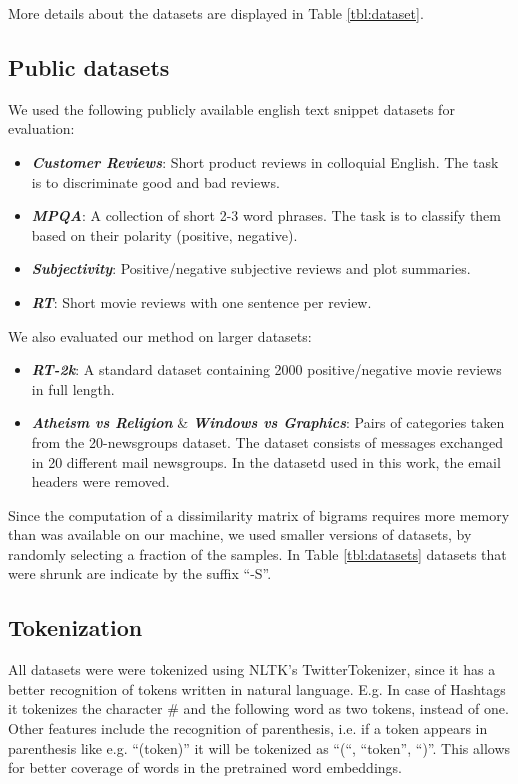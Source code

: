 More details about the datasets are displayed in Table \ref{tbl:dataset}. 

\subsection{Public datasets}

We used the following publicly available english text snippet datasets for
evaluation:

\begin{itemize}
  \item \textbf{\textit{Customer Reviews}}: Short product reviews in colloquial
  English. The task is to discriminate good and bad reviews.
  \item \textbf{\textit{MPQA}}: A collection of short 2-3 word phrases. The task is to
  classify them based on their polarity (positive, negative).
  \item \textbf{\textit{Subjectivity}}:  Positive/negative subjective reviews and plot
  summaries.
  \item \textbf{\textit{RT}}: Short movie reviews with one sentence per review.
\end{itemize}

We also evaluated our method on larger datasets:
\begin{itemize}
  \item \textbf{\textit{RT-2k}}: A standard dataset containing 2000
  positive/negative movie reviews in full length.
  \item \textbf{\textit{Atheism vs Religion}} \&  \textbf{\textit{Windows vs
  Graphics}}:
  Pairs of categories taken from the 20-newsgroups dataset. The dataset consists of
  messages exchanged in 20 different mail newsgroups. In the datasetd used in
  this work, the email headers were removed.
\end{itemize}

Since the computation of a dissimilarity matrix of bigrams requires more memory
than was available on our machine, we used smaller versions of datasets, by
randomly selecting a fraction of the samples. In Table \ref{tbl:datasets} 
datasets that were shrunk are indicate by the suffix ``-S''.
  
\subsection{Tokenization}

All datasets were were tokenized using NLTK's TwitterTokenizer, since it has a
better recognition of tokens written in natural language. E.g. In case of
Hashtags it tokenizes the character \# and the following word as two tokens, instead of one.
Other features include the recognition of parenthesis, i.e. if a token
appears in parenthesis like e.g. ``(token)'' it will be tokenized as ``(``,
``token'', ``)''. This allows for better coverage of words in the pretrained
word embeddings.

